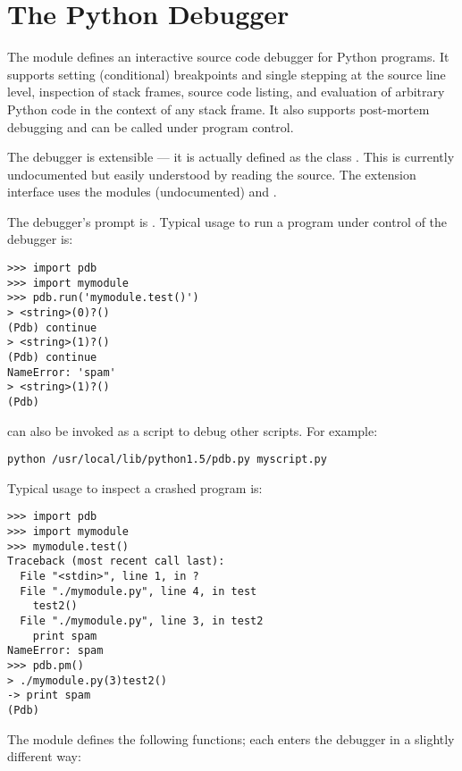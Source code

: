 \chapter{The Python Debugger \label{debugger}}



The module  defines an interactive source code
debugger for Python programs.  It supports setting
(conditional) breakpoints and single stepping at the source line
level, inspection of stack frames, source code listing, and evaluation
of arbitrary Python code in the context of any stack frame.  It also
supports post-mortem debugging and can be called under program
control.

The debugger is extensible --- it is actually defined as the class
.
This is currently undocumented but easily understood by reading the
source.  The extension interface uses the modules
 (undocumented) and
.

The debugger's prompt is .
Typical usage to run a program under control of the debugger is:

\begin{verbatim}
>>> import pdb
>>> import mymodule
>>> pdb.run('mymodule.test()')
> <string>(0)?()
(Pdb) continue
> <string>(1)?()
(Pdb) continue
NameError: 'spam'
> <string>(1)?()
(Pdb) 
\end{verbatim}

 can also be invoked as
a script to debug other scripts.  For example:

\begin{verbatim}
python /usr/local/lib/python1.5/pdb.py myscript.py
\end{verbatim}

Typical usage to inspect a crashed program is:

\begin{verbatim}
>>> import pdb
>>> import mymodule
>>> mymodule.test()
Traceback (most recent call last):
  File "<stdin>", line 1, in ?
  File "./mymodule.py", line 4, in test
    test2()
  File "./mymodule.py", line 3, in test2
    print spam
NameError: spam
>>> pdb.pm()
> ./mymodule.py(3)test2()
-> print spam
(Pdb) 
\end{verbatim}

The module defines the following functions; each enters the debugger
in a slightly different way:

